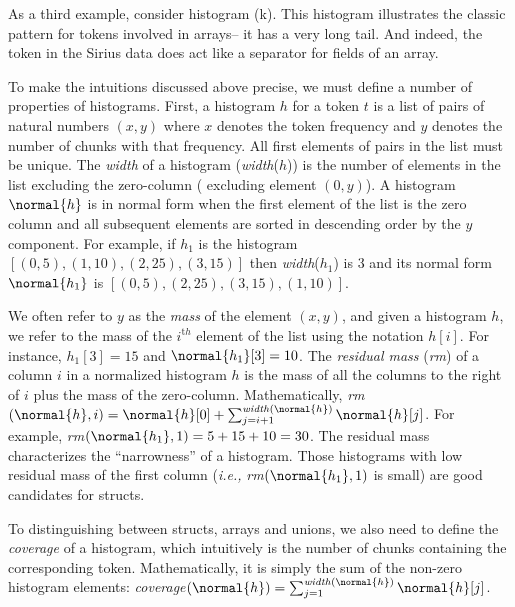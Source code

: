 As a third example, consider histogram (k).  This histogram illustrates
the classic pattern for tokens involved in arrays-- it has a very long
tail.  And indeed, the \cd{|} token in the Sirius data does act like a
separator for fields of an array. 

To make the intuitions discussed above precise, we must define a number of
properties of histograms.  First, a histogram $h$ for a token $t$ is a list of pairs
of natural numbers $(x,y)$ where $x$ denotes the token frequency and
$y$ denotes the number of chunks with that frequency.  
All first elements of pairs in the list must be unique.  
The {\em width} of a
histogram ({\em width}($h$)) is the number of elements in the list
excluding the zero-column (\ie{} excluding element $(0,y)$).  
A histogram
$\normal{h}$ is in normal form when the first element of the list is
the zero column and all subsequent elements are sorted in descending
order by the $y$ component.  For example, if $h_1$ is the histogram
$[(0,5), (1,10), (2,25), (3,15)]$ then {\em width}($h_1$) is 3 and its
normal form $\normal{h_1}$ is $[(0,5), (2, 25), (3,15), (1,10)]$.

We often refer to $y$ as the {\em mass} of the element $(x,y)$,
and given a histogram $h$, we refer to the mass of the $i^{\mathrm th}$
element of the list 
using the notation $h[i]$.  For instance, $h_1[3] = 15$ and 
$\normal{h_1}[3] = 10$.  The {\em residual mass} ({\em rm}) of a column $i$ in 
a normalized histogram $h$ is the mass of all the columns to the right of 
$i$ plus the mass of the zero-column.  Mathematically, 
{\em rm}$(\normal{h},i) = \normal{h}[0] + \sum_{j=i+1}^{\mathit{width}(\normal{h})} \normal{h}[j]$.
For example, {\em rm}$(\normal{h_1},1) = 5 + 15 + 10 = 30$.
The residual mass characterizes the ``narrowness''
of a histogram.  Those histograms with low residual mass of the first
column ({\em i.e.,} {\em rm}$(\normal{h_1},1)$ is small) 
are good candidates for structs.

To distinguishing between structs, arrays and unions,
we also need to define the {\em coverage} of a histogram, which
intuitively is the number of chunks containing the corresponding token.
Mathematically, it is simply the sum of the non-zero histogram elements:
{\em coverage}$(\normal{h}) = 
                  \sum_{j=1}^{\mathit{width}(\normal{h})} \normal{h}[j]$.

